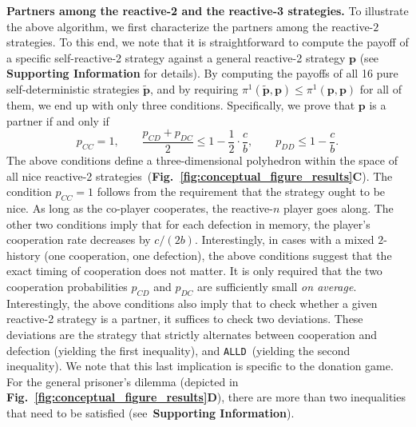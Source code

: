 \documentclass[11pt]{article}
\newcommand{\figref}[1]{{\textbf{Fig.~\ref{#1}}}}
\def\alld{\texttt{ALLD}}
\def\SI{\textbf{Supporting Information}}
\begin{document}
\noindent
\textbf{Partners among the reactive-2 and the reactive-3 strategies.}
To illustrate the above algorithm, we first characterize the partners among the reactive-$2$ strategies. 
To this end, we note that it is straightforward to compute the payoff of a specific self-reactive-2 strategy against a general reactive-2 strategy $\mathbf{p}$ (see \SI{} for details). 
By computing the payoffs of all 16 pure self-deterministic strategies $\mathbf{\tilde p}$, and by requiring $\pi^1(\mathbf{\tilde p},\mathbf{p}) \!\le\! \pi^1(\mathbf{p},\mathbf{p})$ for all of them, we end up with only three conditions. Specifically, we prove that $\mathbf{p}$ is a partner if and only if
\begin{equation}\label{eq:two_bit_conditions}
  p_{CC} = 1, \qquad  \frac{p_{CD} + p_{DC}}{2} \le 1 - \frac{1}{2} \!\cdot\! \frac{c}{b}, \qquad  p_{DD} \leq 1\!-\! \frac{c}{b}.
\end{equation}
The above conditions define a three-dimensional polyhedron within the space of all nice reactive-2 strategies~(\figref{fig:conceptual_figure_results}\textbf{C}).
The condition $p_{CC}\!=\!1$ follows from the requirement that the strategy ought to be nice. 
As long as the co-player cooperates, the reactive-$n$ player goes along. 
The other two conditions imply that for each defection in memory, the player's cooperation rate decreases by $c/(2b)$.
Interestingly, in cases with a mixed $2$-history (one cooperation, one defection), the above conditions suggest that the exact timing of cooperation does not matter. 
It is only required that the two cooperation probabilities $p_{CD}$ and $p_{DC}$ are sufficiently small {\it on average}. 
Interestingly, the above conditions also imply that to check whether a given reactive-2 strategy is a partner, it suffices to check two deviations. 
These deviations are the strategy that strictly alternates between cooperation and defection (yielding the first inequality), and \alld~(yielding the second inequality). 
We note that this last implication is specific to the donation game. 
For the general prisoner's dilemma (depicted in \figref{fig:conceptual_figure_results}\textbf{D}), there are more than two inequalities that need to be satisfied (see~\SI{}).
\end{document}
